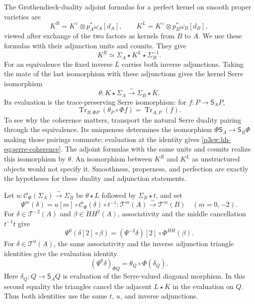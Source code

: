 \documentclass[11pt]{article}
\numberwithin{equation}{section}
\begin{document}
The Grothendieck-duality adjoint formulas for a perfect kernel on
smooth proper varieties are
\[
 K^R=K^\vee\otimes p_A^*\omega_A[d_A],
 \qquad
 K^L=K^\vee\otimes p_B^*\omega_B[d_B],
\]
viewed after exchange of the two factors as kernels from \(B\) to
\(A\).  We use these formulas with their adjunction units and
counits.  They give
\[
 K^R\simeq\Sigma_A\star K^L\star\Sigma_B^{-1}.
\]
For an equivalence the fixed inverse \(L\) carries both inverse
adjunctions.  Taking the mate of the last isomorphism with these
adjunctions gives the kernel Serre isomorphism
\[
 \theta:K\star\Sigma_A\xrightarrow{\sim}\Sigma_B\star K.
\]
Its evaluation is the trace-preserving Serre isomorphism: for
\(f:P\to\mathsf S_AP\),
\begin{equation}
 \operatorname{Tr}_{B,\Phi P}(\theta_P\circ\Phi f)
       =\operatorname{Tr}_{A,P}(f).
\label{p3sw:hh-eq:serre-coherence}
\end{equation}
To see why the coherence matters, transport the natural Serre
duality pairing through the equivalence.  Its uniqueness determines
the isomorphism \(\Phi\mathsf S_A\to\mathsf S_B\Phi\) making those
pairings commute; evaluation at the identity gives
\eqref{p3sw:hh-eq:serre-coherence}.  The adjoint formulas with the
same units and counits realize this isomorphism by \(\theta\).
An isomorphism between \(K^R\) and \(K^L\) as unstructured objects
would not specify it.  Smoothness, properness, and perfection are
exactly the hypotheses for these duality and adjunction statements.

Let \(u:\mathcal C_\Phi(\Sigma_A)\xrightarrow{\sim}\Sigma_B\) be
\(\theta\star L\) followed by \(\Sigma_B\star t\), and set
\[
 \Psi^m(\delta)
   =u[m]\circ\mathcal C_\Phi(\delta)\circ t^{-1}:
       \mathscr T^m(A)\xrightarrow{\sim}\mathscr T^m(B)
       \quad(m=0,-2).
\]
For \(\delta\in\mathscr T^{-2}(A)\) and \(\beta\in HH^2(A)\),
associativity and the middle cancellation \(t^{-1}t\) give
\begin{equation}
 \Psi^0(\delta[2]\circ\beta)
      =(\Psi^{-2}\delta)[2]\circ\Phi^{HH}(\beta).
\label{p3sw:hh-eq:test-composition}
\end{equation}
For \(\delta\in\mathscr T^0(A)\), the same associativity and the
inverse adjunction triangle identities give the evaluation identity
\begin{equation}
 (\Psi^0\delta)_{\Phi Q}
       =\theta_Q\circ\Phi(\delta_Q).
\label{p3sw:hh-eq:serre-evaluation}
\end{equation}
Here \(\delta_Q:Q\to\mathsf S_AQ\) is evaluation of the
Serre-valued diagonal morphism.  In this second equality the
triangles cancel the adjacent \(L\star K\) in the evaluation on \(Q\).
Thus both identities use the same \(t\), \(u\), and inverse
adjunctions.
\end{document}
